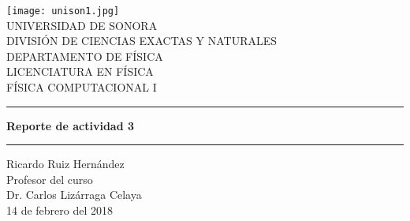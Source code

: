 \documentclass{article}
\begin{document}
\begin{center}
\texttt{[image: unison1.jpg]}
\\
\vspace{0.5cm}
UNIVERSIDAD DE SONORA \\
\vspace{0.5cm}
DIVISIÓN DE CIENCIAS EXACTAS Y NATURALES \\
\vspace{0.5cm}
DEPARTAMENTO DE FÍSICA\\
\vspace{0.5cm}
LICENCIATURA EN FÍSICA\\
\vspace{0.5cm}
FÍSICA COMPUTACIONAL I

\vspace{2 cm}
\hrule
\vspace{1 cm}

{\huge \bfseries {Reporte de actividad 3}}
\\
\vspace{1 cm}
\hrule
\vspace{2 cm}
Ricardo Ruiz Hernández\\ 
\vspace{1 cm}
Profesor del curso\\
Dr. Carlos Lizárraga Celaya\\
\vspace{2 cm}
14 de febrero del 2018
\end{center}
\end{document}
